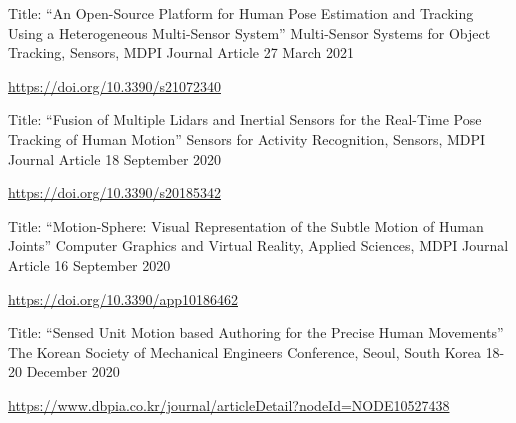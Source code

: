 

\begin{cventries}


  \cventry
    {Title: “An Open-Source Platform for Human Pose Estimation and Tracking Using a Heterogeneous Multi-Sensor System”} %
    {Multi-Sensor Systems for Object Tracking, Sensors, MDPI} %
    {Journal Article} %
    {27 March 2021} %
    {
      \begin{cvitems} %
        \item {\url{https://doi.org/10.3390/s21072340}}
      \end{cvitems}
    }

  \cventry
    {Title: “Fusion of Multiple Lidars and Inertial Sensors for the Real-Time Pose Tracking of Human Motion”} %
    {Sensors for Activity Recognition, Sensors, MDPI} %
    {Journal Article} %
    {18 September 2020} %
    {
      \begin{cvitems} %
        \item {\url{https://doi.org/10.3390/s20185342}}
      \end{cvitems}
    }


 \cventry
    {Title: “Motion-Sphere: Visual Representation of the Subtle Motion of Human Joints”} %
    {Computer Graphics and Virtual Reality, Applied Sciences, MDPI} %
    {Journal Article} %
    {16 September 2020} %
    {
      \begin{cvitems} %
        \item{\url{https://doi.org/10.3390/app10186462}}
      \end{cvitems}
    }

  \cventry
    {Title: “Sensed Unit Motion based Authoring for the Precise Human Movements”} %
    {The Korean Society of Mechanical Engineers} %
    {Conference, Seoul, South Korea} %
    {18-20 December 2020} %
    {
      \begin{cvitems} %
        \item {\url{https://www.dbpia.co.kr/journal/articleDetail?nodeId=NODE10527438}}
      \end{cvitems}
    }
    

\end{cventries}
